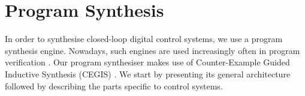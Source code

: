 \documentclass{sig-alternate-05-2015}
\begin{document}






\section{Program Synthesis}


In order to synthesise closed-loop digital control systems, we use a
program synthesis engine.  Nowadays, such engines are used
increasingly often in program verification
\cite{DBLP:conf/cav/0001A14,DBLP:conf/lpar/DavidKL15}.  Our program
synthesiser makes use of Counter-Example Guided Inductive Synthesis
(CEGIS) \cite{sketch}.  We start by presenting its general
architecture followed by describing the parts specific to control
systems.
\end{document}
